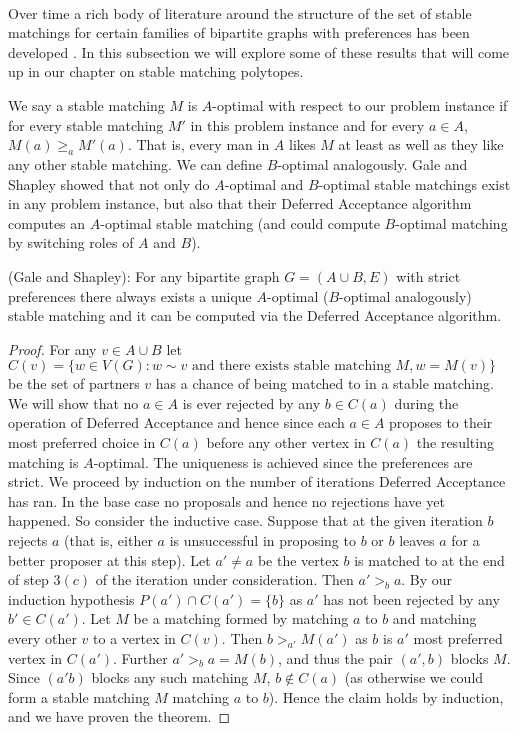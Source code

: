 \paragraph{}
Over time a rich body of literature around the structure of the set of stable matchings for certain families of bipartite graphs with preferences has been developed \cite{roth1992two}. In this subsection we will explore some of these results that will come up in our chapter on stable matching polytopes.
\begin{definition} We say a stable matching $M$ is $A$-optimal with respect to our problem instance if for every stable matching $M'$ in this problem instance and for every $a \in A$, $M(a) \geq_a M'(a)$. That is, every man in $A$ likes $M$ at least as well as they like any other stable matching. We can define $B$-optimal analogously. Gale and Shapley showed that not only do $A$-optimal and $B$-optimal stable matchings exist in any problem instance, but also that their Deferred Acceptance algorithm computes an $A$-optimal stable matching \cite{gale1962college} (and could compute $B$-optimal matching by switching roles of $A$ and $B$).
\end{definition}
\begin{theorem} (Gale and Shapley): For any bipartite graph $G = (A\cup B, E)$ with strict preferences there always exists a unique $A$-optimal ($B$-optimal analogously) stable matching and it can be computed via the Deferred Acceptance algorithm.
\end{theorem}
\begin{proof}
For any $v \in A\cup B$ let $C(v) = \{w \in V(G) : w \sim v \text{ and there exists stable matching } M, w = M(v) \}$ be the set of partners $v$ has a chance of being matched to in a stable matching. We will show that no $a \in A$ is ever rejected by any $b \in C(a)$ during the operation of Deferred Acceptance and hence since each $a \in A$ proposes to their most preferred choice in $C(a)$ before any other vertex in $C(a)$ the resulting matching is $A$-optimal. The uniqueness is achieved since the preferences are strict. We proceed by induction on the number of iterations Deferred Acceptance has ran. In the base case no proposals and hence no rejections have yet happened. So consider the inductive case. Suppose that at the given iteration $b$ rejects $a$ (that is, either $a$ is unsuccessful in proposing to $b$ or $b$ leaves $a$ for a better proposer at this step). Let $a' \neq a$ be the vertex $b$ is matched to at the end of step $3(c)$ of the iteration under consideration. Then $a' >_b a$. By our induction hypothesis $P(a') \cap C(a') = \{b\}$ as $a'$ has not been rejected by any $b' \in C(a')$. Let $M$ be a matching formed by matching $a$ to $b$ and matching every other $v$ to a vertex in $C(v)$. Then $b >_{a'} M(a')$ as $b$ is $a'$ most preferred vertex in $C(a')$. Further $a' >_b a=M(b)$, and thus the pair $(a',b)$ blocks $M$. Since $(a'b)$ blocks any such matching $M$, $b \not\in C(a)$ (as otherwise we could form a stable matching $M$ matching $a$ to $b$). Hence the claim holds by induction, and we have proven the theorem. \end{proof}
